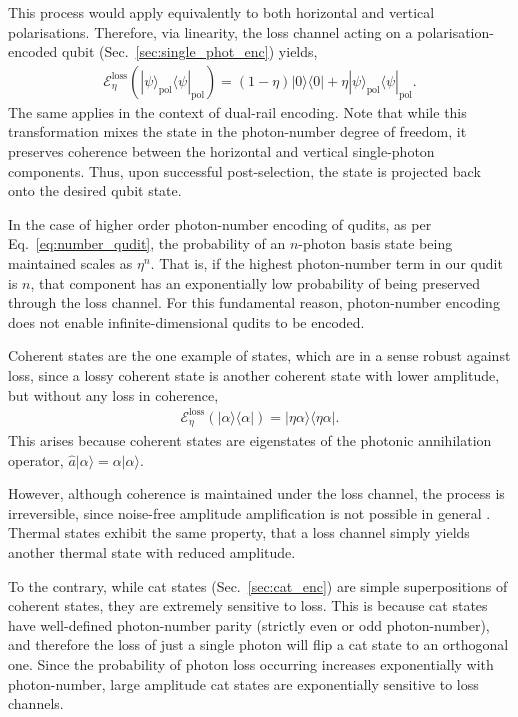 \documentclass[aps,rmp,twocolumn,amsmath,amssymb,nofootinbib,superscriptaddress]{revtex4}
\newcommand{\bra}[1]{\langle#1|}
\newcommand{\ket}[1]{|#1\rangle}
\begin{document}
This process would apply equivalently to both horizontal and vertical polarisations. Therefore, via linearity, the loss channel acting on a polarisation-encoded qubit (Sec.~\ref{sec:single_phot_enc}) yields,
\begin{align}
\mathcal{E}^\mathrm{loss}_\eta(\ket\psi_\mathrm{pol}\bra\psi_\mathrm{pol}) = (1-\eta) \ket{0}\bra{0} + \eta\ket\psi_\mathrm{pol}\bra\psi_\mathrm{pol}.
\end{align}
The same applies in the context of dual-rail encoding. Note that while this transformation mixes the state in the photon-number degree of freedom, it preserves coherence between the horizontal and vertical single-photon components. Thus, upon successful post-selection, the state is projected back onto the desired qubit state.

In the case of higher order photon-number encoding of qudits, as per Eq.~\ref{eq:number_qudit}, the probability of an $n$-photon basis state being maintained scales as $\eta^n$. That is, if the highest photon-number term in our qudit is $n$, that component has an exponentially low probability of being preserved through the loss channel. For this fundamental reason, photon-number encoding does not enable infinite-dimensional qudits to be encoded.

Coherent states are the one example of states, which are in a sense robust against loss, since a lossy coherent state is another coherent state with lower amplitude, but without any loss in coherence,
\begin{align}
\mathcal{E}^\mathrm{loss}_\eta(\ket\alpha\bra\alpha) = \ket{\eta\alpha}\bra{\eta\alpha}.
\end{align}
This arises because coherent states are eigenstates of the photonic annihilation operator, \mbox{$\hat{a}\ket{\alpha}=\alpha\ket{\alpha}$}.

However, although coherence is maintained under the loss channel, the process is irreversible, since noise-free amplitude amplification is not possible in general \cite{???}. Thermal states exhibit the same property, that a loss channel simply yields another thermal state with reduced amplitude.

To the contrary, while cat states (Sec.~\ref{sec:cat_enc}) are simple superpositions of coherent states, they are extremely sensitive to loss. This is because cat states have well-defined photon-number parity (strictly even or odd photon-number), and therefore the loss of just a single photon will flip a cat state to an orthogonal one. Since the probability of photon loss occurring increases exponentially with photon-number, large amplitude cat states are exponentially sensitive to loss channels.
\end{document}
